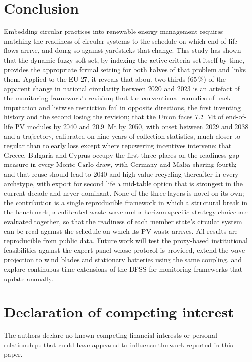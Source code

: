 \documentclass[a4paper,fleqn]{cas-sc}
\begin{document}
\section{Conclusion}\label{sec:conclusion}
Embedding circular practices into renewable energy management requires matching the readiness of circular systems to the schedule on which end-of-life flows arrive, and doing so against yardsticks that change. This study has shown that the dynamic fuzzy soft set, by indexing the active criteria set itself by time, provides the appropriate formal setting for both halves of that problem and links them. Applied to the EU-27, it reveals that about two-thirds (65\,\%) of the apparent change in national circularity between 2020 and 2023 is an artefact of the monitoring framework's revision; that the conventional remedies of back-imputation and listwise restriction fail in opposite directions, the first inventing history and the second losing the revision; that the Union faces \SI{7.2}{Mt} of end-of-life PV modules by 2040 and \SI{20.9}{Mt} by 2050, with onset between 2029 and 2038 and a trajectory, calibrated on nine years of collection statistics, much closer to regular than to early loss except where repowering incentives intervene; that Greece, Bulgaria and Cyprus occupy the first three places on the readiness-gap measure in every Monte Carlo draw, with Germany and Malta sharing fourth; and that reuse should lead to 2040 and high-value recycling thereafter in every archetype, with export for second life a mid-table option that is strongest in the current decade and never dominant. None of the three layers is novel on its own; the contribution is a single reproducible framework in which a structural break in the benchmark, a calibrated waste wave and a horizon-specific strategy choice are evaluated together, so that the readiness of each member state's circular system can be read against the schedule on which its PV waste arrives. All results are reproducible from public data. Future work will test the proxy-based institutional feasibilities against the expert panel whose protocol is provided, extend the wave projection to wind blades and stationary batteries using the same coupling, and explore continuous-time extensions of the DFSS for monitoring frameworks that update annually.

\printcredits

\section*{Declaration of competing interest}
The authors declare no known competing financial interests or personal relationships that could have appeared to influence the work reported in this paper.
\end{document}
